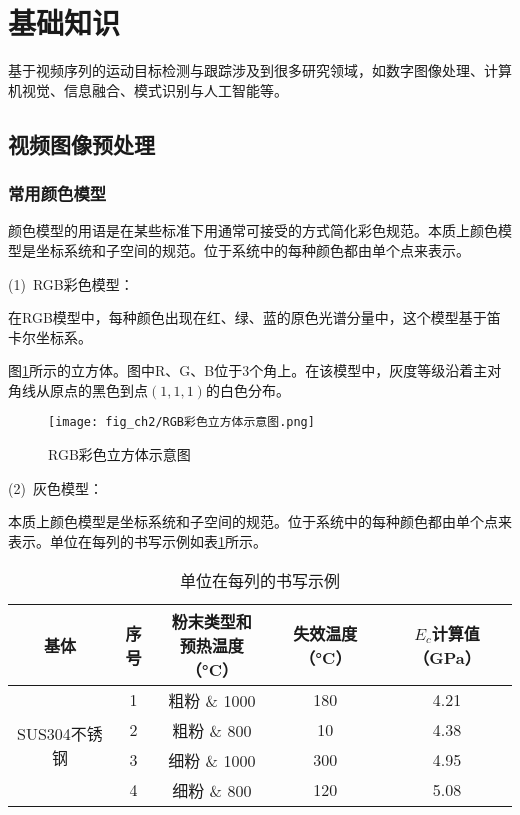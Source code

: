 
\section{基础知识}

基于视频序列的运动目标检测与跟踪涉及到很多研究领域，如数字图像处理、计算机视觉、信息融合、模式识别与人工智能等。

\subsection{视频图像预处理}

\subsubsection{常用颜色模型}

颜色模型的用语是在某些标准下用通常可接受的方式简化彩色规范。本质上颜色模型是坐标系统和子空间的规范。位于系统中的每种颜色都由单个点来表示。

(1)~RGB彩色模型：

在RGB模型中，每种颜色出现在红、绿、蓝的原色光谱分量中，这个模型基于笛卡尔坐标系。

图\ref{fig:RGB彩色立方体示意图}所示的立方体。图中R、G、B位于$3$个角上。在该模型中，灰度等级沿着主对角线从原点的黑色到点$(1,1,1)$的白色分布。
\begin{figure}[H]
  \centering
  \texttt{[image: fig\_ch2/RGB彩色立方体示意图.png]}
  \caption{RGB彩色立方体示意图}
  \label{fig:RGB彩色立方体示意图}
\end{figure}

(2)~灰色模型：

本质上颜色模型是坐标系统和子空间的规范。位于系统中的每种颜色都由单个点来表示。单位在每列的书写示例如表\ref{tab:单位在每列的书写示例}所示。

\begin{table}[H]
  \centering
  \caption{单位在每列的书写示例}
    \begin{tabular}{ccccc}
    \toprule
    基体 & 序号 & \makecell[c]{粉末类型和\\ 预热温度（\unit{\degreeCelsius}）} & 失效温度（\unit{\degreeCelsius}） & $E_c$计算值（\unit{\GPa}）\\
    \midrule
    \multicolumn{1}{c}{\multirow{4}[2]{*}{SUS304不锈钢}} & 1     & 粗粉 \& 1000 & 180   & 4.21 \\
          & 2     & 粗粉 \& 800 & 10    & 4.38 \\
          & 3     & 细粉 \& 1000 & 300   & 4.95 \\
          & 4     & 细粉 \& 800 & 120   & 5.08 \\
    \bottomrule
    \end{tabular}%
  \label{tab:单位在每列的书写示例}%
\end{table}%

